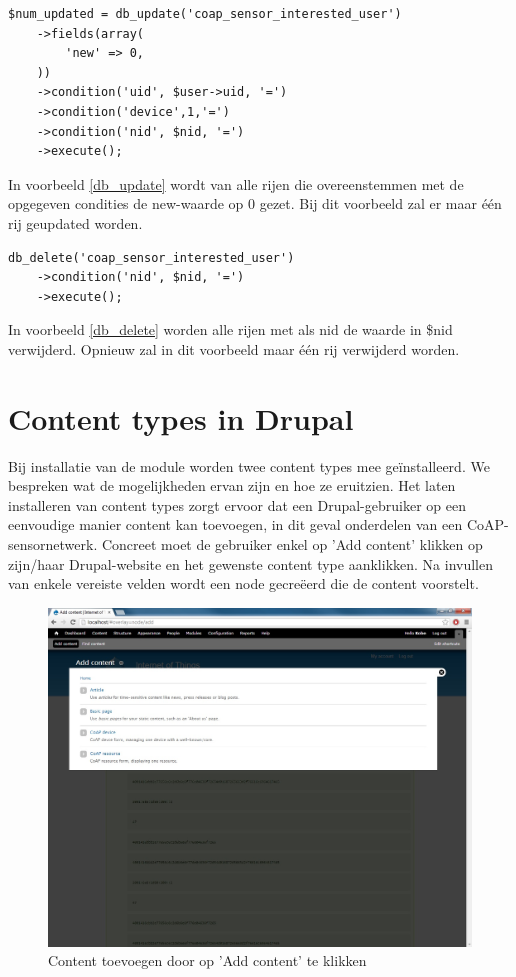 \lstset{language=PHP}
\begin{lstlisting}[label=db_update,caption=Voorbeeld gebruik van db\_update]
$num_updated = db_update('coap_sensor_interested_user')
	->fields(array(
		'new' => 0,
	))
	->condition('uid', $user->uid, '=')
	->condition('device',1,'=')
	->condition('nid', $nid, '=')
	->execute();
\end{lstlisting}
In voorbeeld \ref{db_update} wordt van alle rijen die overeenstemmen met de opgegeven condities de new-waarde op 0 gezet. Bij dit voorbeeld zal er maar \'{e}\'{e}n rij geupdated worden.

\lstset{language=PHP}
\begin{lstlisting}[label=db_delete,caption=Voorbeeld gebruik van db\_delete]
db_delete('coap_sensor_interested_user')
	->condition('nid', $nid, '=')
	->execute();
\end{lstlisting}
In voorbeeld \ref{db_delete} worden alle rijen met als nid de waarde in \$nid verwijderd. Opnieuw zal in dit voorbeeld maar \'{e}\'{e}n rij verwijderd worden.

\section{Content types in Drupal}

Bij installatie van de module worden twee content types mee ge\"{i}nstalleerd. We bespreken wat de mogelijkheden ervan zijn en hoe ze eruitzien. Het laten installeren van content types zorgt ervoor dat een Drupal-gebruiker op een eenvoudige manier content kan toevoegen, in dit geval onderdelen van een CoAP-sensornetwerk. Concreet moet de gebruiker enkel op 'Add content' klikken op zijn/haar Drupal-website en het gewenste content type aanklikken. Na invullen van enkele vereiste velden wordt een node gecre\"{e}erd die de content voorstelt.
\begin{figure}[h!]
\vspace{10pt}
\centering
\includegraphics[width=1\textwidth]{fig/add_content}
\caption{Content toevoegen door op 'Add content' te klikken}
\label{fig:addContent}
\end{figure}

